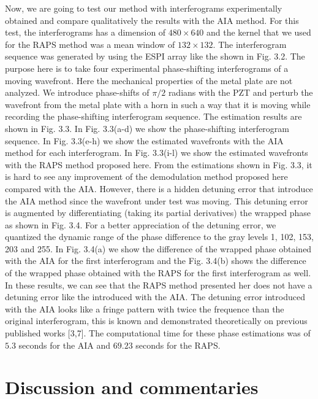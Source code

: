 Now, we are going to test our method with interferograms experimentally obtained
and compare qualitatively the results with the AIA method. For this test, the
interferograms has a dimension of $480 \times 640$ and the kernel that we used
for the RAPS method was a mean window of $132\times 132$. The interferogram
sequence was generated by using the ESPI array like the shown in Fig. 3.2. The
purpose here is to take four experimental phase-shifting interferograms of a
moving wavefront. Here the mechanical properties of the metal plate are not
analyzed. We introduce phase-shifts of $\pi/2$ radians with the PZT and perturb
the wavefront from the metal plate with a horn in such a way that it is moving
while recording the phase-shifting interferogram sequence. The estimation
results are shown in Fig. 3.3. In Fig. 3.3(a-d) we show the phase-shifting
interferogram sequence. In Fig. 3.3(e-h) we show the estimated wavefronts with
the AIA method for each interferogram. In Fig. 3.3(i-l) we show the estimated
wavefronts with the RAPS method proposed here. From the estimations shown in
Fig. 3.3, it is hard to see any improvement of the demodulation method proposed
here compared with the AIA. However, there is a hidden detuning error that
introduce the AIA method since the wavefront under test was moving. This
detuning error is augmented by differentiating (taking its partial derivatives)
the wrapped phase as shown in Fig. 3.4. For a better appreciation of the
detuning error, we quantized the dynamic range of the phase difference to the
gray levels 1, 102, 153, 203 and 255. In Fig. 3.4(a) we show the difference of
the wrapped phase obtained with the AIA for the first interferogram and the
Fig. 3.4(b) shows the difference of the wrapped phase obtained with the RAPS for
the first interferogram as well. In these results, we can see that the RAPS
method presented her does not have a detuning error like the introduced with the
AIA. The detuning error introduced with the AIA looks like a fringe pattern with
twice the frequence than the original interferogram, this is known and
demonstrated theoretically on previous published works [3,7]. The computational
time for these phase estimations was of $5.3$ seconds for the AIA and $69.23$
seconds for the RAPS.

\section{Discussion and commentaries}

